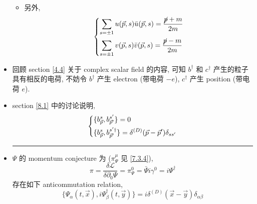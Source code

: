 \begin{itemize}
\begin{itemize}
		\item 另外,
		\begin{equation}
			\begin{dcases}
				\sum_{s = \pm 1} u(\vec{p}, s) \bar{u}(\vec{p}, s) = \frac{\cancel{p} + m}{2 m} \\
				\sum_{s = \pm 1} v(\vec{p}, s) \bar{v}(\vec{p}, s) = \frac{\cancel{p} - m}{2 m}
			\end{dcases}
		\end{equation}
	\end{itemize}
	
	\item 回顾 section \ref{4.4} 关于 complex scalar field 的内容, 可知 $b^\dag$ 和 $c^\dag$ 产生的粒子具有相反的电荷, 不妨令 $b^\dag$ 产生 electron (带电荷 $- e$), $c^\dag$ 产生 position (带电荷 $e$).
	
	\item section \ref{8.1} 中的讨论说明,
	\begin{equation}
		\begin{dcases}
			\{b^s_{\vec{p}}, b^{s'}_{\vec{p}'}\} = 0 \\
			\{b^s_{\vec{p}}, b^{s' \dag}_{\vec{p}'}\} = \delta^{(D)}(\vec{p} - \vec{p}') \delta_{s s'}
		\end{dcases}
	\end{equation}
	
	\noindent\rule[0.5ex]{\linewidth}{0.5pt} %
	
	\item $\Psi$ 的 momentum conjecture 为 ($\pi_\Psi^\mu$ 见 \eqref{7.3.4}),
	\begin{equation}
		\pi = \frac{\delta \mathcal{L}}{\delta \partial_0 \Psi} = \pi_\Psi^0 = \bar{\Psi} i \gamma^0 = i \Psi^\dag
	\end{equation}
	存在如下 anticommutation relation,
	\begin{equation}
		\{\Psi_\alpha(t, \vec{x}), i \Psi^\dag_\beta(t, \vec{y})\} = i \delta^{(D)}(\vec{x} - \vec{y}) \delta_{\alpha \beta}
	\end{equation}
\end{itemize}
